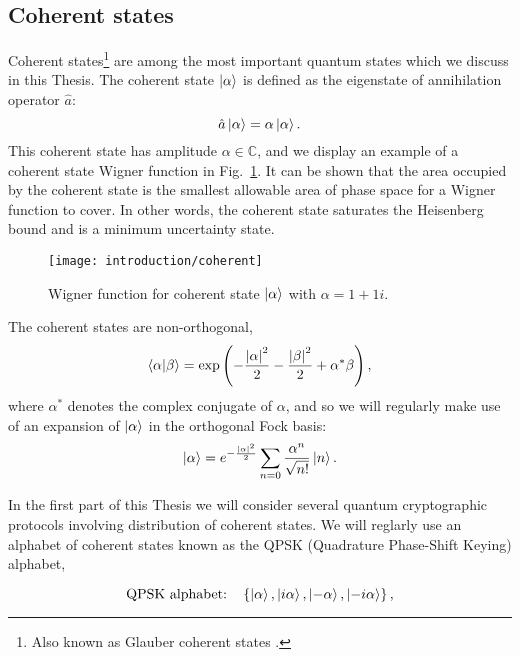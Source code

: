 \FloatBarrier
\subsection{Coherent states}
Coherent states\footnote{Also known as Glauber coherent states \cite{Glauber1963}.} are among the most important quantum states which we discuss in this Thesis. The coherent state $\ket{\alpha}$ is defined as the eigenstate of annihilation operator $\hat{a}$:
\begin{equation}
\hat{a}\ket{\alpha} = \alpha \ket{\alpha}.
\end{equation}
This coherent state has amplitude $\alpha \in \mathbb{C}$, and we display an example of a coherent state Wigner function in Fig.~\ref{fig:intro_coherent_wigner}. It can be shown that the area occupied by the coherent state is the smallest allowable area of phase space for a Wigner function to cover. In other words, the coherent state saturates the Heisenberg bound and is a minimum uncertainty state.%

\begin{figure}[htp]
\centering
\captionsetup{width=0.8\linewidth}
\texttt{[image: introduction/coherent]}
\caption{\label{fig:intro_coherent_wigner} Wigner function for coherent state $\ket{\alpha}$ with $\alpha = 1 + 1i$.}
\end{figure}

\noindent The coherent states are non-orthogonal,
\begin{equation}
\ip{\alpha}{\beta} = \exp\left(- \frac{\left|\alpha\right|^2}{2} - \frac{\left|\beta\right|^2}{2} + \alpha^* \beta \right),
\end{equation}
where $\alpha^*$ denotes the complex conjugate of $\alpha$, and so we will regularly make use of an expansion of $\ket{\alpha}$ in the orthogonal Fock basis:
\begin{equation}\label{eqn:intro_coherent_fock}
\ket{\alpha} = e^{-\frac{\left|\alpha\right|^2}{2}} \sum_{n=0} \frac{\alpha^n}{\sqrt{n!}} \ket{n}.
\end{equation}

\noindent In the first part of this Thesis we will consider several quantum cryptographic protocols involving distribution of coherent states. We will reglarly use an alphabet of coherent states known as the QPSK (Quadrature Phase-Shift Keying) alphabet, 

\begin{equation}
\qq*{QPSK alphabet:} \left\{\ket{\alpha}, \ket{i \alpha}, \ket{- \alpha}, \ket{- i \alpha}\right\},
\end{equation}

